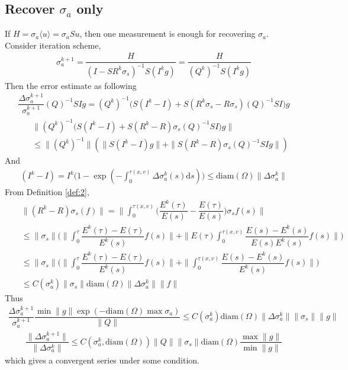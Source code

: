 \documentclass[12pt,a4paper]{article}
\newcommand{\avg}[1]{\langle#1\rangle}
\begin{document}
\subsection{Recover $\sigma_a$ only}
If $H = \sigma_a \avg{u} = \sigma_a Su$, then one measurement is enough for recovering $\sigma_a$. Consider iteration scheme,
\begin{eqnarray}
\sigma_a^{k+1} = \dfrac{H}{(I-SR^k\sigma_s)^{-1}S(I^kg)}= \dfrac{H}{(Q^k)^{-1}S(I^kg)}
\end{eqnarray}
Then the error estimate as following
\begin{eqnarray}
\dfrac{\Delta\sigma_a^{k+1}}{\sigma_a^{k+1}}(Q)^{-1}SIg =(Q^k)^{-1}\Big(S(I^k-I)+ S(R^k\sigma_s - R\sigma_s)(Q)^{-1}SI\Big)g
\end{eqnarray}
\begin{eqnarray}
&&\|(Q^k)^{-1}\Big(S(I^k-I)+ S(R^k - R)\sigma_s(Q)^{-1}SI\Big)g\|\nonumber\\
&&\le \|(Q^k)^{-1}\|(\|S(I^k - I)g\| + \|S(R^k - R)\sigma_s(Q)^{-1}SIg\|)
\end{eqnarray}
And
\begin{eqnarray}
(I^k - I) = I^k\Big(1 - \exp(-\int_0^{\tau(x,v)} \Delta \sigma_a^k(s)\mathrm{d}s)\Big)\le \mathrm{diam}(\Omega)\|\Delta \sigma_a^k\|
\end{eqnarray}
From Definition \ref{def:2},
\begin{eqnarray}
&&\|(R^k - R)\sigma_s(f)\| = \|\int_0^{\tau(x,v)}\Big(\dfrac{E^k(\tau)}{E(s)} - \dfrac{E(\tau)}{E(s)}\Big)\sigma_sf(s)\|\\
&&\le \|\sigma_s\|\Big(\|\int_{0}^{\tau} \dfrac{E^k(\tau)-E(\tau)}{E^k(s)}f(s)\| +
\|E(\tau)\int_0^{\tau(x,v)}\dfrac{E(s) - E^k(s)}{E(s)E^k(s)}f(s)\|\Big)\nonumber\\
&&\le \|\sigma_s\|\Big(\|\int_{0}^{\tau} \dfrac{E^k(\tau)-E(\tau)}{E^k(s)}f(s)\| +
\|\int_0^{\tau(x,v)}\dfrac{E(s) - E^k(s)}{E^k(s)}f(s)\|\Big)\\
&&\le C(\sigma_a^k)\|\sigma_s\| \mathrm{diam}(\Omega)\|\Delta\sigma_a^k\|\|f\|
\end{eqnarray}
Thus
\begin{eqnarray}
\dfrac{\Delta\sigma_a^{k+1}}{\sigma_a^{k+1}}\dfrac{\min \|g\|\exp(-\mathrm{diam}(\Omega)\max\sigma_a)}{\|Q\|}\le C(\sigma_a^k) \mathrm{diam}(\Omega)\|\Delta \sigma_a^k\|\|\sigma_s\|\|g\|
\end{eqnarray}
\begin{eqnarray}
\dfrac{\|\Delta \sigma_a^{k+1}\|}{\|\Delta \sigma_a^k\|} \le C(\sigma_a^k, \mathrm{diam}(\Omega))\|Q\|\|\sigma_s\|\mathrm{diam}(\Omega)\dfrac{\max\|g\|}{\min\|g\|}
\end{eqnarray}
which gives a convergent series under some condition.
\end{document}
